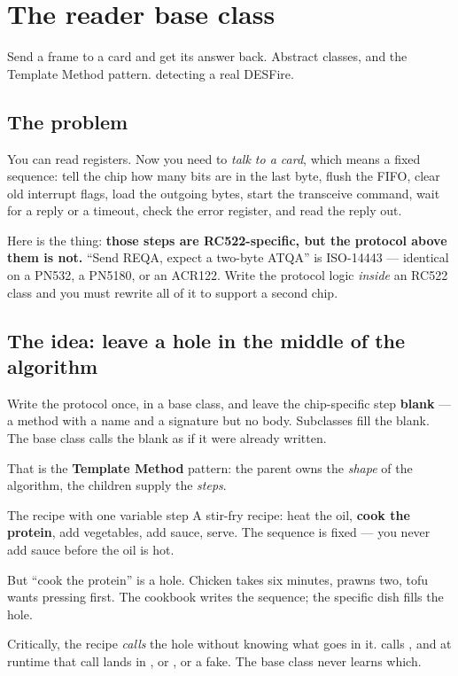 \chapter{The reader base class}
\label{ch:reader}

\chapterbrief
  {Send a frame to a card and get its answer back.}
  {Abstract classes, and the Template Method pattern.}
  { detecting a real DESFire.}

\section{The problem}

You can read registers. Now you need to \emph{talk to a card}, which means a
fixed sequence: tell the chip how many bits are in the last byte, flush the
FIFO, clear old interrupt flags, load the outgoing bytes, start the transceive
command, wait for a reply or a timeout, check the error register, and read the
reply out.

Here is the thing: \textbf{those steps are RC522-specific, but the protocol
above them is not.} ``Send REQA, expect a two-byte ATQA'' is ISO-14443 ---
identical on a PN532, a PN5180, or an ACR122. Write the protocol logic
\emph{inside} an RC522 class and you must rewrite all of it to support a second
chip.

\section{The idea: leave a hole in the middle of the algorithm}

Write the protocol once, in a base class, and leave the chip-specific step
\textbf{blank} --- a method with a name and a signature but no body. Subclasses
fill the blank. The base class calls the blank as if it were already written.

That is the \textbf{Template Method} pattern: the parent owns the \emph{shape}
of the algorithm, the children supply the \emph{steps}.

\begin{analogy}{The recipe with one variable step}
A stir-fry recipe: heat the oil, \textbf{cook the protein}, add vegetables, add
sauce, serve. The sequence is fixed --- you never add sauce before the oil is hot.

But ``cook the protein'' is a hole. Chicken takes six minutes, prawns two, tofu
wants pressing first. The cookbook writes the sequence; the specific dish fills
the hole.

Critically, the recipe \emph{calls} the hole without knowing what goes in it.
 calls , and at runtime that call lands
in , or , or a fake. The base class never
learns which.
\end{analogy}

